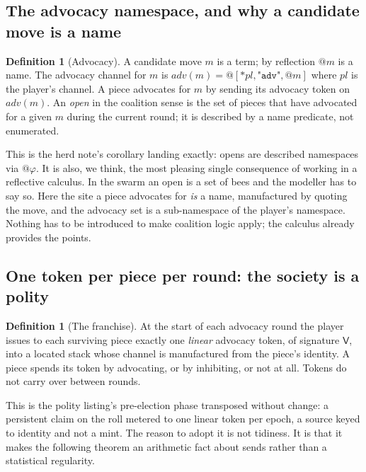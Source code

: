 \documentclass[11pt,a4paper]{article}
\makeatletter
\theoremstyle{plain}
\theoremstyle{definition}
\newtheorem{definition}[theorem]{Definition}
\theoremstyle{remark}
\newcommand{\qt}[1]{\ensuremath{@#1}}
\makeatother
\begin{document}
\subsection{The advocacy namespace, and why a candidate move is a name}

\begin{definition}[Advocacy]
\label{def:advocacy}
A candidate move $m$ is a term; by reflection $\qt{m}$ is a name. The advocacy
channel for $m$ is $\mathit{adv}(m) = \qt{[*\mathit{pl},\texttt{"adv"},\qt{m}]}$
where $\mathit{pl}$ is the player's channel. A piece advocates for $m$ by
sending its advocacy token on $\mathit{adv}(m)$. An \emph{open} in the coalition
sense is the set of pieces that have advocated for a given $m$ during the
current round; it is described by a name predicate, not enumerated.
\end{definition}

This is the herd note's corollary landing exactly: opens are described
namespaces via $\qt\varphi$. It is also, we think, the most pleasing single
consequence of working in a reflective calculus. In the swarm an open is a set
of bees and the modeller has to say so. Here the site a piece advocates for
\emph{is} a name, manufactured by quoting the move, and the advocacy set is a
sub-namespace of the player's namespace. Nothing has to be introduced to make
coalition logic apply; the calculus already provides the points.

\subsection{One token per piece per round: the society is a polity}

\begin{definition}[The franchise]
\label{def:franchise}
At the start of each advocacy round the player issues to each surviving piece
exactly one \emph{linear} advocacy token, of signature $\mathsf{V}$, into a
located stack whose channel is manufactured from the piece's identity. A piece
spends its token by advocating, or by inhibiting, or not at all. Tokens do not
carry over between rounds.
\end{definition}

This is the polity listing's pre-election phase transposed without change: a
persistent claim on the roll metered to one linear token per epoch, a source
keyed to identity and not a mint. The reason to adopt it is not tidiness. It is
that it makes the following theorem an arithmetic fact about sends rather than a
statistical regularity.
\end{document}
